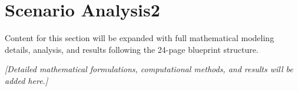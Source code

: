 \section{Scenario Analysis2}

Content for this section will be expanded with full mathematical modeling details, analysis, and results following the 24-page blueprint structure.

\vspace{0.5cm}

\noindent \textit{[Detailed mathematical formulations, computational methods, and results will be added here.]}
